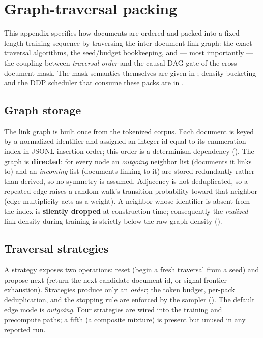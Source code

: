 \section{Graph-traversal packing}
\label{app:traversal}

This appendix specifies how documents are ordered and packed into a fixed-length
training sequence by traversing the inter-document link graph: the exact traversal
algorithms, the seed/budget bookkeeping, and --- most importantly --- the coupling
between \emph{traversal order} and the causal DAG gate of the cross-document mask.
The mask semantics themselves are given in ; density
bucketing and the DDP scheduler that consume these packs are in .

\subsection{Graph storage}
\label{app:traversal:graph}

The link graph is built once from the tokenized corpus. Each document is keyed by a
normalized identifier and assigned an integer id equal to its enumeration index in
JSONL insertion order; this order is a determinism dependency
(). The graph is \textbf{directed}: for every node an
\emph{outgoing} neighbor list (documents it links to) and an \emph{incoming} list
(documents linking to it) are stored redundantly rather than derived, so no symmetry
is assumed. Adjacency is not deduplicated, so a repeated edge raises a random walk's
transition probability toward that neighbor (edge multiplicity acts as a weight). A
neighbor whose identifier is absent from the index is \textbf{silently dropped} at
construction time; consequently the \emph{realized} link density during training is
strictly below the raw graph density ().

\subsection{Traversal strategies}
\label{app:traversal:strategies}

A strategy exposes two operations: reset (begin a fresh traversal from a seed) and
propose-next (return the next candidate document id, or signal frontier exhaustion).
Strategies produce only an \emph{order}; the token budget, per-pack deduplication, and
the stopping rule are enforced by the sampler (). The
default edge mode is \emph{outgoing}. Four strategies are wired into the training and
precompute paths; a fifth (a composite mixture) is present but unused in any reported
run.

